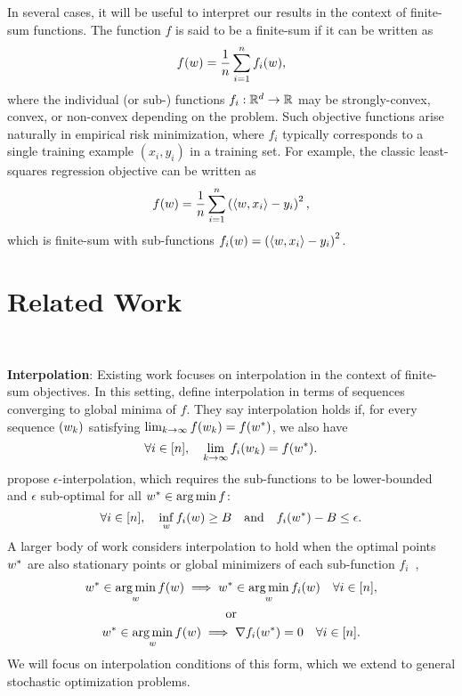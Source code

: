 In several cases, it will be useful to interpret our results in the context of finite-sum functions.
The function \( f \) is said to be a finite-sum if it can be written as 
\[ f(w) = \frac{1}{n} \sum_{i=1}^n f_i(w),  \]
where the individual (or sub-) functions \( f_i : \mathbb{R}^d \rightarrow \mathbb{R} \) may be strongly-convex, convex, or non-convex depending on the problem.
Such objective functions arise naturally in empirical risk minimization, where \( f_i \) typically corresponds to a single training example \( (x_i, y_i) \) in a training set.
For example, the classic least-squares regression objective can be written as 
\[ f(w) = \frac{1}{n} \sum_{i=1}^n \left(\left\langle w, x_i\right\rangle - y_i\right)^2, \] 
which is finite-sum with sub-functions \( f_i(w) =  \left(\left\langle w, x_i\right\rangle - y_i\right)^2 \).


\section{Related Work}~\label{sec:related-work}

\noindent \textbf{Interpolation}:
Existing work focuses on interpolation in the context of finite-sum objectives. 
In this setting, \citet{bassily2018exponential} define interpolation in terms of sequences converging to global minima of \( f \). 
They say interpolation holds if, for every sequence \( \left(w_k\right) \) satisfying \( \lim_{k \rightarrow \infty} f(w_k) = f(w^*) \), we also have 
\[ \forall i \in [n], \quad \lim_{k \rightarrow \infty} f_i(w_k) = f(w^*). \]
\citet{berrada2019training} propose \( \epsilon \)-interpolation, which requires the sub-functions to be lower-bounded and \( \epsilon \) sub-optimal for all \( w^* \in \mathop{\rm arg\,min} f \): 
\[ \forall i \in [n], \quad \inf_w f_i(w) \geq B \quad \text{and} \quad f_i(w^*) - B \leq \epsilon. \]
A larger body of work considers interpolation to hold when the optimal points \( w^* \) are also stationary points or global minimizers of each sub-function \( f_i \)~\citep{vaswani2019fast, vaswani2019painless, vaswani2020adaptive, meng2020fastandfurious, loizou2020sps},
\begin{gather*}
    w^* \in \mathop{\rm arg\,min}_{w} f(w) \implies w^* \in \mathop{\rm arg\,min}_{w} f_i(w) \quad \forall i \in [n],\\
          \text{or} \\
    w^* \in \mathop{\rm arg\,min}_{w} f(w) \implies \nabla f_i(w^*) = 0 \quad \forall i \in [n].
\end{gather*}
We will focus on interpolation conditions of this form, which we extend to general stochastic optimization problems.\\ 


